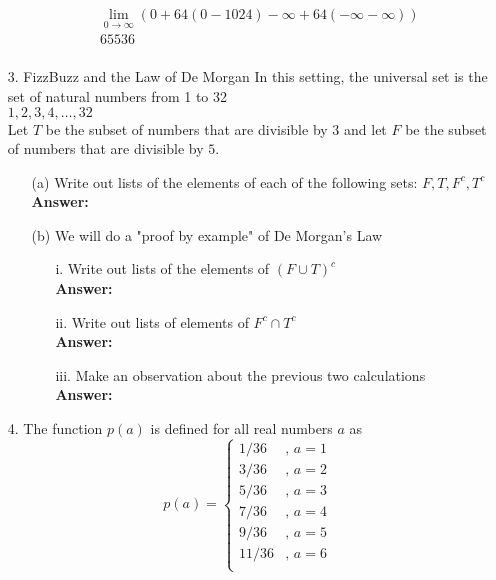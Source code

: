 \documentclass[a4paper]{article}
\begin{document}
\begin{itemize}
\begin{itemize}
\begin{equation}
\begin{split}
	      	      		\lim_{0\to\infty} (0 + 64(0 - 1024) - \infty + 64(-\infty - \infty)) \\
	      	      		65536 \\
	      	      	\end{split}
	      	      \end{equation}
	      \end{itemize}  
	\item[3.] FizzBuzz and the Law of De Morgan In this setting, the universal set is the set of natural numbers from 1 to 32 \\
	      ${1, 2, 3, 4, \ldots, 32}$ \\
	      Let $T$ be the subset of numbers that are divisible by $3$ and let $F$ be the subset of numbers that are divisible by $5$.
	      \begin{itemize}
	      	\item[(a)] Write out lists of the elements of each of the following sets: $F, T, F^{c}, T^{c}$
	      	      \textbf{Answer:} 
	      	\item[(b)] We will do a "proof by example" of De Morgan's Law
	      	      \begin{itemize}
	      	      	\item[i.] Write out lists of the elements of $(F \cup T)^{c}$ \\
	      	      	      \textbf{Answer:} 
	      	      	\item[ii.] Write out lists of elements of $F^{c} \cap T^{c}$ \\
	      	      	      \textbf{Answer:} 
	      	      	\item[iii.] Make an observation about the previous two calculations \\
	      	      	      \textbf{Answer:} 
	      	      \end{itemize}  
	      \end{itemize}
	\item[4.] The function $p(a)$ is defined for all real numbers $a$ as \\
	      \[
	      	p(a) =
	      	\begin{cases}
	      		1/36  & \text{, $a = 1$}   \\
	      		3/36  & \text{, $a = 2$}   \\
	      		5/36  & \text{, $a = 3$}   \\
	      		7/36  & \text{, $a = 4$}   \\
	      		9/36  & \text{, $a = 5$}   \\
	      		11/36 & \text{, $a = 6$}   \\

\end{cases}\]
\end{itemize}
\end{document}
